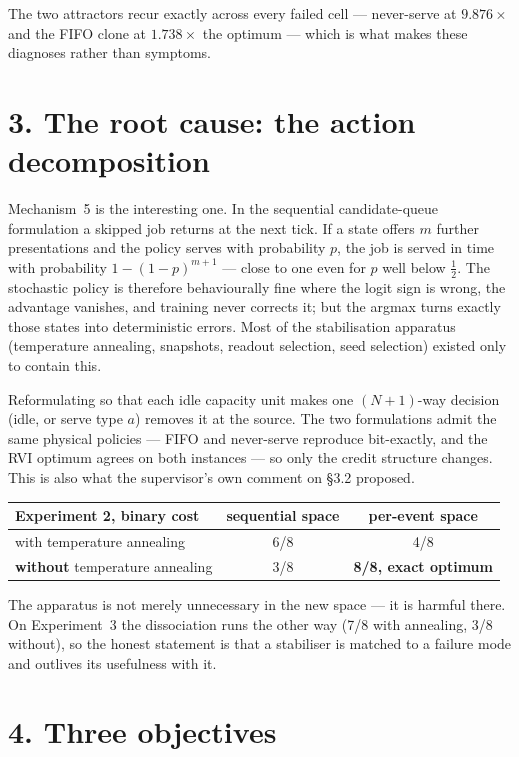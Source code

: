 \documentclass[11pt,a4paper]{article}
\begin{document}
The two attractors recur exactly across every failed cell --- never-serve at
$9.876\times$ and the FIFO clone at $1.738\times$ the optimum --- which is what
makes these diagnoses rather than symptoms.

\section*{3. The root cause: the action decomposition}

Mechanism~5 is the interesting one.  In the sequential candidate-queue
formulation a skipped job returns at the next tick.  If a state offers $m$
further presentations and the policy serves with probability $p$, the job is
served in time with probability $1-(1-p)^{m+1}$ --- close to one even for $p$ well
below $\tfrac12$.  The stochastic policy is therefore behaviourally fine where
the logit sign is wrong, the advantage vanishes, and training never corrects
it; but the argmax turns exactly those states into deterministic errors.  Most
of the stabilisation apparatus (temperature annealing, snapshots, readout
selection, seed selection) existed only to contain this.

Reformulating so that each idle capacity unit makes one $(N{+}1)$-way decision
(idle, or serve type $a$) removes it at the source.  The two formulations admit
the same physical policies --- FIFO and never-serve reproduce bit-exactly, and
the RVI optimum agrees on both instances --- so only the credit structure
changes.  This is also what the supervisor's own comment on \S3.2 proposed.

\begin{center}
\begin{tabular}{lcc}
\toprule
Experiment 2, binary cost & sequential space & per-event space \\
\midrule
with temperature annealing & 6/8 & 4/8 \\
\textbf{without} temperature annealing & 3/8 & \textbf{8/8, exact optimum} \\
\bottomrule
\end{tabular}
\end{center}

The apparatus is not merely unnecessary in the new space --- it is harmful there.
On Experiment~3 the dissociation runs the other way (7/8 with annealing, 3/8
without), so the honest statement is that a stabiliser is matched to a failure
mode and outlives its usefulness with it.

\section*{4. Three objectives}
\end{document}
